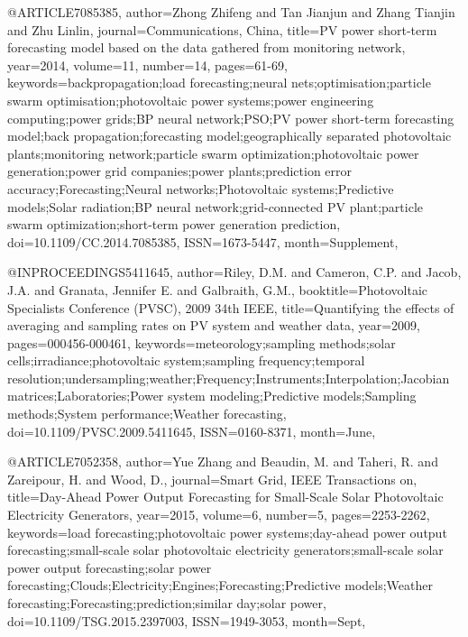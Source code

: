 {@ARTICLE{7085385, 
author={Zhong Zhifeng and Tan Jianjun and Zhang Tianjin and Zhu Linlin}, 
journal={Communications, China}, 
title={PV power short-term forecasting model based on the data gathered from monitoring network}, 
year={2014}, 
volume={11}, 
number={14}, 
pages={61-69}, 
keywords={backpropagation;load forecasting;neural nets;optimisation;particle swarm optimisation;photovoltaic power systems;power engineering computing;power grids;BP neural network;PSO;PV power short-term forecasting model;back propagation;forecasting model;geographically separated photovoltaic plants;monitoring network;particle swarm optimization;photovoltaic power generation;power grid companies;power plants;prediction error accuracy;Forecasting;Neural networks;Photovoltaic systems;Predictive models;Solar radiation;BP neural network;grid-connected PV plant;particle swarm optimization;short-term power generation prediction}, 
doi={10.1109/CC.2014.7085385}, 
ISSN={1673-5447}, 
month={Supplement},}

@INPROCEEDINGS{5411645, 
author={Riley, D.M. and Cameron, C.P. and Jacob, J.A. and Granata, Jennifer E. and Galbraith, G.M.}, 
booktitle={Photovoltaic Specialists Conference (PVSC), 2009 34th IEEE}, 
title={Quantifying the effects of averaging and sampling rates on PV system and weather data}, 
year={2009}, 
pages={000456-000461}, 
keywords={meteorology;sampling methods;solar cells;irradiance;photovoltaic system;sampling frequency;temporal resolution;undersampling;weather;Frequency;Instruments;Interpolation;Jacobian matrices;Laboratories;Power system modeling;Predictive models;Sampling methods;System performance;Weather forecasting}, 
doi={10.1109/PVSC.2009.5411645}, 
ISSN={0160-8371}, 
month={June},}

@ARTICLE{7052358, 
author={Yue Zhang and Beaudin, M. and Taheri, R. and Zareipour, H. and Wood, D.}, 
journal={Smart Grid, IEEE Transactions on}, 
title={Day-Ahead Power Output Forecasting for Small-Scale Solar Photovoltaic Electricity Generators}, 
year={2015}, 
volume={6}, 
number={5}, 
pages={2253-2262}, 
keywords={load forecasting;photovoltaic power systems;day-ahead power output forecasting;small-scale solar photovoltaic electricity generators;small-scale solar power output forecasting;solar power forecasting;Clouds;Electricity;Engines;Forecasting;Predictive models;Weather forecasting;Forecasting;prediction;similar day;solar power}, 
doi={10.1109/TSG.2015.2397003}, 
ISSN={1949-3053}, 
month={Sept},}

}
